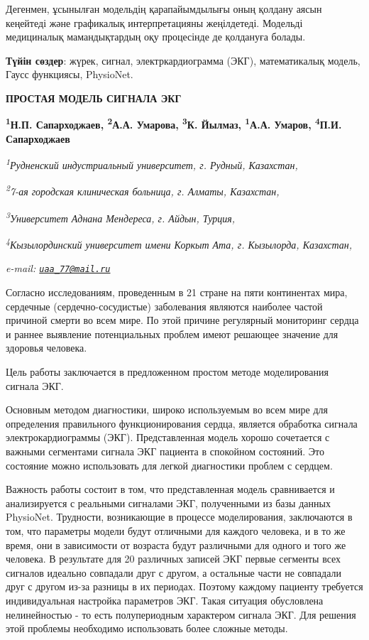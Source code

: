 Дегенмен, ұсынылған модельдің қарапайымдылығы оның қолдану аясын
кеңейтеді және графикалық интерпретацияны жеңілдетеді. Модельді
медициналық мамандықтардың оқу процесінде де қолдануға болады.

{\bfseries Түйін сөздер}: жүрек, сигнал, электркардиограмма (ЭКГ),
математикалық модель, Гаусс функциясы, PhysioNet.

\begin{articleheader}
{\bfseries ПРОСТАЯ МОДЕЛЬ СИГНАЛА ЭКГ}

{\bfseries
\textsuperscript{1}Н.П. Сапарходжаев,
\textsuperscript{2}А.А. Умарова,
\textsuperscript{3}К. Йылмаз,
\textsuperscript{1}А.А. Умаров\textsuperscript{\envelope },
\textsuperscript{4}П.И. Сапарходжаев}
\end{articleheader}

\begin{affiliation}
\emph{\textsuperscript{1}Рудненский индустриальный университет, г. Рудный, Казахстан,}

\emph{\textsuperscript{2}7-ая городская клиническая больница, г. Алматы, Казахстан,}

\emph{\textsuperscript{3}Университет Аднана Мендереса, г. Айдын, Турция,}

\emph{\textsuperscript{4}Кызылординский университет имени Коркыт Ата, г. Кызылорда, Казахстан,}

\emph{e-mail: \href{mailto:uaa_77@mail.ru}{\nolinkurl{uaa\_77@mail.ru}}}
\end{affiliation}

Согласно исследованиям, проведенным в 21 стране на пяти континентах
мира, сердечные (сердечно-сосудистые) заболевания являются наиболее
частой причиной смерти во всем мире. По этой причине регулярный
мониторинг сердца и раннее выявление потенциальных проблем имеют
решающее значение для здоровья человека.

Цель работы заключается в предложенном простом методе моделирования
сигнала ЭКГ.

Основным методом диагностики, широко используемым во всем мире для
определения правильного функционирования сердца, является обработка
сигнала электрокардиограммы (ЭКГ). Представленная модель хорошо
сочетается с важными сегментами сигнала ЭКГ пациента в спокойном
состояний. Это состояние можно использовать для легкой диагностики
проблем с сердцем.

Важность работы состоит в том, что представленная модель сравнивается и
анализируется с реальными сигналами ЭКГ, полученными из базы данных
PhysioNet. Трудности, возникающие в процессе моделирования, заключаются
в том, что параметры модели будут отличными для каждого человека, и в то
же время, они в зависимости от возраста будут различными для одного и
того же человека. В результате для 20 различных записей ЭКГ первые
сегменты всех сигналов идеально совпадали друг с другом, а остальные
части не совпадали друг с другом из-за разницы в их периодах. Поэтому
каждому пациенту требуется индивидуальная настройка параметров ЭКГ.
Такая ситуация обусловлена нелинейностью - то есть полупериодным
характером сигнала ЭКГ. Для решения этой проблемы необходимо
использовать более сложные методы.

